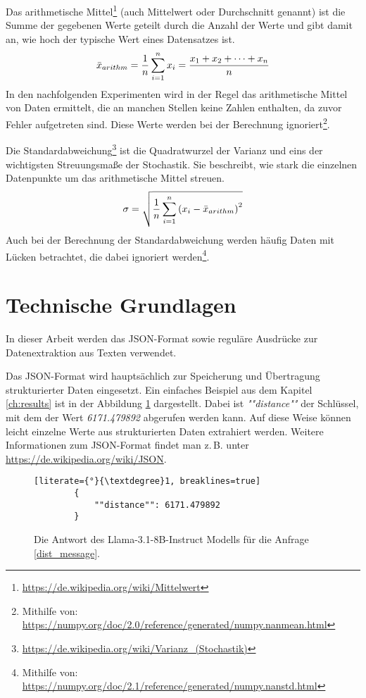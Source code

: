 Das arithmetische Mittel\footnote{\url{https://de.wikipedia.org/wiki/Mittelwert}} (auch Mittelwert oder Durchschnitt genannt) ist die Summe der gegebenen Werte geteilt durch die Anzahl der Werte und gibt damit an, wie hoch der typische Wert eines Datensatzes ist.
\[ \bar{x}_{arithm} = \frac{1}{n} \sum_{i = 1}^{n} x_i = \frac{x_1 + x_2 + \cdots + x_n}{n} \]
In den nachfolgenden Experimenten wird in der Regel das arithmetische Mittel von Daten ermittelt, die an manchen Stellen keine Zahlen enthalten, da zuvor Fehler aufgetreten sind.
Diese Werte werden bei der Berechnung ignoriert\footnote{Mithilfe von: \url{https://numpy.org/doc/2.0/reference/generated/numpy.nanmean.html}}.

Die Standardabweichung\footnote{\url{https://de.wikipedia.org/wiki/Varianz_(Stochastik)}} ist die Quadratwurzel der Varianz und eins der wichtigsten Streuungsmaße der Stochastik.
Sie beschreibt, wie stark die einzelnen Datenpunkte um das arithmetische Mittel streuen.
\[ \sigma = \sqrt{ \frac{1}{n} \sum_{i = 1}^{n} \left( x_i - \bar{x}_{arithm} \right)^2 } \]
Auch bei der Berechnung der Standardabweichung werden häufig Daten mit Lücken betrachtet, die dabei ignoriert werden\footnote{Mithilfe von: \url{https://numpy.org/doc/2.1/reference/generated/numpy.nanstd.html}}.



\section*{Technische Grundlagen}
In dieser Arbeit werden das JSON-Format sowie reguläre Ausdrücke zur Datenextraktion aus Texten verwendet.

Das JSON-Format wird hauptsächlich zur Speicherung und Übertragung strukturierter Daten eingesetzt.
Ein einfaches Beispiel aus dem Kapitel \ref{ch:results} ist in der Abbildung \ref{dist_answer_background} dargestellt.
Dabei ist \textit{""distance""} der Schlüssel, mit dem der Wert \textit{6171.479892} abgerufen werden kann.
Auf diese Weise können leicht einzelne Werte aus strukturierten Daten extrahiert werden.
Weitere Informationen zum JSON-Format findet man z.\,B. unter \url{https://de.wikipedia.org/wiki/JSON}.

\begin{figure} %

    \begin{lstlisting}[literate={°}{\textdegree}1, breaklines=true]
        {
            ""distance"": 6171.479892
        }
    \end{lstlisting}

    \caption{Die Antwort des Llama-3.1-8B-Instruct Modells für die Anfrage \ref{dist_message}.}

    \label{dist_answer_background}
\end{figure}

